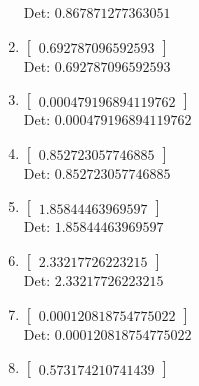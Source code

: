 \documentclass[12pt]{article}
\begin{document}
\begin{enumerate}
Det: $0.867871277363051$\\

\item $\displaystyle \left[\begin{matrix}0.692787096592593\end{matrix}\right]$\\

Det: $0.692787096592593$\\

\item $\displaystyle \left[\begin{matrix}0.000479196894119762\end{matrix}\right]$\\

Det: $0.000479196894119762$\\

\item $\displaystyle \left[\begin{matrix}0.852723057746885\end{matrix}\right]$\\

Det: $0.852723057746885$\\

\item $\displaystyle \left[\begin{matrix}1.85844463969597\end{matrix}\right]$\\

Det: $1.85844463969597$\\

\item $\displaystyle \left[\begin{matrix}2.33217726223215\end{matrix}\right]$\\

Det: $2.33217726223215$\\

\item $\displaystyle \left[\begin{matrix}0.000120818754775022\end{matrix}\right]$\\

Det: $0.000120818754775022$\\

\item $\displaystyle \left[\begin{matrix}0.573174210741439\end{matrix}\right]$\\


\end{enumerate}
\end{document}
